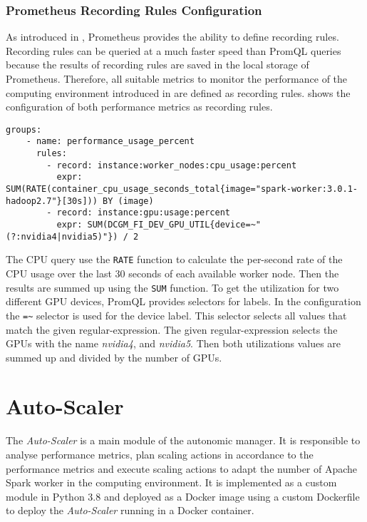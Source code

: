 \subsubsection{Prometheus Recording Rules Configuration}
%
As introduced in , Prometheus provides the ability to define recording rules. Recording rules can be queried at a much faster speed than PromQL queries because the results of recording rules are saved in the local storage of Prometheus.
%
Therefore, all suitable metrics to monitor the performance of the computing environment introduced in  are defined as recording rules.
%
 shows the configuration of both performance metrics as recording rules.
%
\begin{lstlisting}[label=lst:06_env_depl_am_prom-rules, caption=Prometheus target configuration in YAML syntax]
groups:
    - name: performance_usage_percent
      rules:
        - record: instance:worker_nodes:cpu_usage:percent
          expr: SUM(RATE(container_cpu_usage_seconds_total{image="spark-worker:3.0.1-hadoop2.7"}[30s])) BY (image)
        - record: instance:gpu:usage:percent
          expr: SUM(DCGM_FI_DEV_GPU_UTIL{device=~"(?:nvidia4|nvidia5)"}) / 2
\end{lstlisting}
The CPU query use the \texttt{RATE} function to calculate the per-second rate of the CPU usage over the last 30 seconds of each available worker node. Then the results are summed up using the \texttt{SUM} function.
To get the utilization for two different GPU devices, PromQL provides selectors for labels. In the configuration the \texttt{=\~} selector is used for the device label. This selector selects all values that match the given regular-expression. The given regular-expression selects the GPUs with the name \textit{nvidia4}, and \textit{nvidia5}. Then both utilizations values are summed up and divided by the number of GPUs.


\section{Auto-Scaler}
The \textit{Auto-Scaler} is a main module of the autonomic manager. It is responsible to analyse performance metrics, plan scaling actions in accordance to the performance metrics and execute scaling actions to adapt the number of Apache Spark worker in the computing environment.
It is implemented as a custom module in Python 3.8 and deployed as a Docker image using a custom Dockerfile to deploy the \textit{Auto-Scaler} running in a Docker container.


